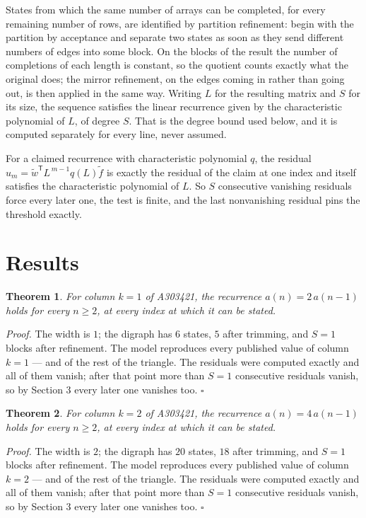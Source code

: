 \documentclass[11pt]{article}
\newtheorem{theorem}{Theorem}
\theoremstyle{definition}
\begin{document}
States from which the same number of arrays can be completed, for every remaining number of rows, are identified by partition refinement: begin with the partition by acceptance and separate two states as soon as they send different numbers of edges into some block. On the blocks of the result the number of completions of each length is constant, so the quotient counts exactly what the original does; the mirror refinement, on the edges coming in rather than going out, is then applied in the same way. Writing $L$ for the resulting matrix and $S$ for its size, the sequence satisfies the linear recurrence given by the characteristic polynomial of $L$, of degree $S$. That is the degree bound used below, and it is computed separately for every line, never assumed.

For a claimed recurrence with characteristic polynomial $q$, the residual $u_m = \tilde w^{\mathsf T}L^{\,m-1}q(L)\tilde f$ is exactly the residual of the claim at one index and itself satisfies the characteristic polynomial of $L$. So $S$ consecutive vanishing residuals force every later one, the test is finite, and the last nonvanishing residual pins the threshold exactly.

\section{Results}

\begin{theorem} For column $k = 1$ of A303421, the recurrence $a(n) = 2\,a(n-1)$ holds for every $n \ge 2$, at every index at which it can be stated.\end{theorem}

{\itshape Proof.} The width is $1$; the digraph has $6$ states, $5$ after trimming, and $S = 1$ blocks after refinement. The model reproduces every published value of column $k = 1$ --- and of the rest of the triangle. The residuals were computed exactly and all of them vanish; after that point more than $S = 1$ consecutive residuals vanish, so by Section 3 every later one vanishes too. $\square$

\begin{theorem} For column $k = 2$ of A303421, the recurrence $a(n) = 4\,a(n-1)$ holds for every $n \ge 2$, at every index at which it can be stated.\end{theorem}

{\itshape Proof.} The width is $2$; the digraph has $20$ states, $18$ after trimming, and $S = 1$ blocks after refinement. The model reproduces every published value of column $k = 2$ --- and of the rest of the triangle. The residuals were computed exactly and all of them vanish; after that point more than $S = 1$ consecutive residuals vanish, so by Section 3 every later one vanishes too. $\square$
\end{document}

